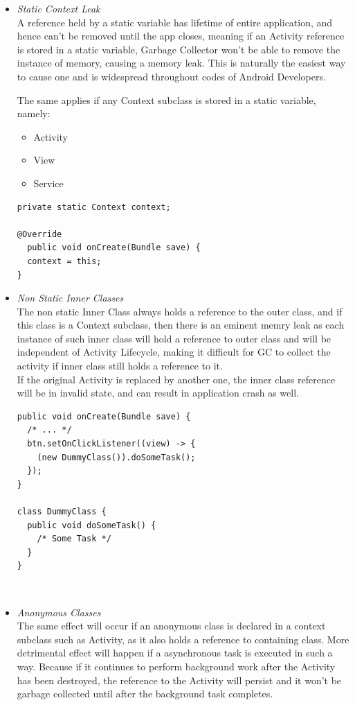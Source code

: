 \documentclass[journal]{IEEEtran}
\begin{document}
\begin{itemize}
	\item \emph{Static Context Leak}\\
	A reference held by a static variable has lifetime of entire application, and hence can't be removed until the app closes, meaning if an Activity reference is stored in a static variable, Garbage Collector won't be able to remove the instance of memory, causing a memory leak. This is naturally the easiest way \cite{ways} to cause one and is widespread throughout codes of Android Developers.
	
	\newpage
	
	The same applies if any Context subclass is stored in a static variable, namely:
	\begin{itemize}
		\item Activity
		\item View
		\item Service
	\end{itemize}
\begin{verbatim}
private static Context context;
	
@Override
  public void onCreate(Bundle save) {
  context = this;
}
\end{verbatim}

	\item \emph{Non Static Inner Classes}\\
	The non static Inner Class always holds a reference to the outer class, and if this class is a Context subclass, then there is an eminent memry leak as each instance of such inner class will hold a reference to outer class and will be independent of Activity Lifecycle, making it difficult for GC to collect the activity if inner class still holds a reference to it.\\
	
	If the original Activity is replaced by another one, the inner class reference will be in invalid state, and can result in application crash as well.
\begin{verbatim}
public void onCreate(Bundle save) {
  /* ... */
  btn.setOnClickListener((view) -> {
    (new DummyClass()).doSomeTask();
  });
}

class DummyClass {
  public void doSomeTask() {
    /* Some Task */
  }
}
\end{verbatim}
\\

	\item \emph{Anonymous Classes}\\
	The same effect will occur if an anonymous class is declared in a context subclass such as Activity, as it also holds a reference to containing class. More detrimental effect will happen if a asynchronous task is executed in such a way. Because if it continues to perform background work after the Activity has been destroyed, the reference to the Activity will persist and it won’t be garbage collected until after the background task completes.\\
	

\end{itemize}
\end{document}
